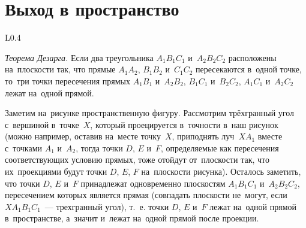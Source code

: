 
\section*{Выход в пространство}


\begin{wrapfigure}{L}{0.4\textwidth}
\vspace{-1em}
\vspace{-2em}
\end{wrapfigure}
\problem\emph{Теорема Дезарга.}
Если два треугольника $A_1 B_1 C_1$ и~$A_2 B_2 C_2$ расположены на~плоскости
так, что прямые $A_1 A_2$, $B_1 B_2$ и~$C_1 C_2$ пересекаются в~одной точке,
то~три точки пересечения прямых $A_1 B_1$ и~$A_2 B_2$, $B_1 C_1$ и~$B_2 C_2$,
$A_1 C_1$ и~$A_2 C_2$ лежат на~одной прямой.

\solution
Заметим на~рисунке пространственную фигуру.
Рассмотрим трёхгранный угол с~вершиной в~точке~$X$, который проецируется
в~точности в~наш рисунок (можно например, оставив на~месте точку~$X$,
приподнять луч~$X A_1$ вместе с~точками $A_1$ и~$A_2$, тогда
точки $D$, $E$ и~$F$, определяемые как пересечения соответствующих условию
прямых, тоже отойдут от~плоскости так, что их~проекциями будут
точки $D$, $E$, $F$ на~плоскости рисунка).
Осталось заметить, что точки $D$, $E$ и~$F$ принадлежат одновременно плоскостям
$A_1 B_1 C_1$ и~$A_2 B_2 C_2$, пересечением которых является прямая
(совпадать плоскости не~могут, если $X A_1 B_1 C_1$~--- трехгранный угол),
т.~е. точки $D$, $E$ и~$F$ лежат на~одной прямой в~пространстве, а~значит
и~лежат на~одной прямой после проекции.

